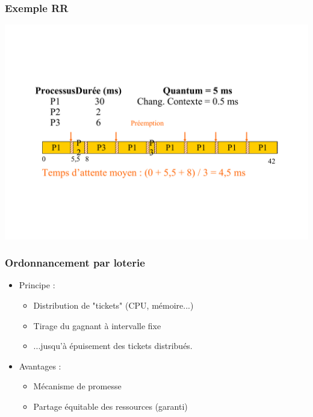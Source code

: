 \begin{frame}
 \frametitle{Exemple RR}
 \includegraphics[width=\textwidth]{../illustration/rr_exemple.pdf}
\end{frame}

\begin{frame}
\frametitle{Ordonnancement par loterie}
\begin{itemize}
\item Principe :
\begin{itemize}
\item Distribution de "tickets" (CPU, mémoire...)
\item Tirage du gagnant à intervalle fixe
\item ...jusqu'à épuisement des tickets distribués.
\end{itemize}
\item Avantages :
\begin{itemize}
\item Mécanisme de promesse
\item Partage équitable des ressources (garanti)
\end{itemize}

\end{itemize}
\end{frame}



